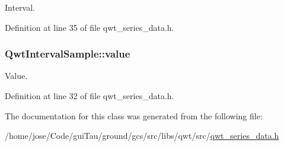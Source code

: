 Interval. 



Definition at line 35 of file qwt\-\_\-series\-\_\-data.\-h.

\hypertarget{class_qwt_interval_sample_ad1e098d87833c45636dc96f9c5c14245}{
\subsubsection[{value}]{ Qwt\-Interval\-Sample\-::value}}\label{class_qwt_interval_sample_ad1e098d87833c45636dc96f9c5c14245}


Value. 



Definition at line 32 of file qwt\-\_\-series\-\_\-data.\-h.



The documentation for this class was generated from the following file\-:\begin{DoxyCompactItemize}
\item 
/home/jose/\-Code/gui\-Tau/ground/gcs/src/libs/qwt/src/\hyperlink{qwt__series__data_8h}{qwt\-\_\-series\-\_\-data.\-h}\end{DoxyCompactItemize}
